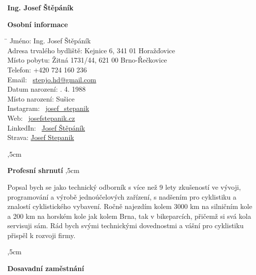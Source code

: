 \documentclass[12pt]{article}
\begin{document}
\begin{center}
\textbf{\LARGE Ing. Josef Štěpáník} \\
\end{center}

\textbf{Osobní informace} 

\begin{tabbing}
    \hspace{6cm}\= \kill
    Jméno: \> Ing. Josef Štěpáník \\
    Adresa trvalého bydliště: \> Kejnice 6, 341 01 Horažďovice \\
    Místo pobytu: \> Žitná 1731/44, 621 00 Brno-Řečkovice \\
    Telefon: \> +420 724 160 236 \\
    Email: \> \faEnvelope \ \href{mailto:stepjo.hd@gmail.com}{stepjo.hd@gmail.com} \\
    Datum narození: . 4. 1988 \\
    Místo narození: \> Sušice \\
    Instagram: \>  \faInstagram \ \href{https://www.instagram.com/josef_stepanik/}{josef\_stepanik} \\
    Web: \>  \faGlobe \ \href{https://www.josefstepanik.cz/}{josefstepanik.cz} \\
    LinkedIn: \>  \faLinkedin \ \href{https://www.linkedin.com/in/josef-štěpáník-30106174/}{Josef Štěpáník} \\
    Strava: \>  \href{https://www.strava.com/athletes/40559859}{Josef Stepanik} 
\end{tabbing}

\noindent\hrulefill
{},5cm

\textbf{Profesní shrnutí}
,5cm

\indent Popsal bych se jako technický odborník s více než 9 lety zkušeností ve vývoji, programování a výrobě jednoúčelových zařízení, 
s nadšením pro cyklistiku a znalostí cyklistického vybavení. 
Ročně najezdím kolem 3000 km na silničním kole a 200 km na horském kole jak kolem Brna, tak v bikeparcích, 
přičemž si svá kola servisuji sám. 
Rád bych svými technickými dovednostmi a vášní pro cyklistiku přispěl k rozvoji firmy.

\noindent\hrulefill
{},5cm

\textbf{Dosavadní zaměstnání}
\end{document}
